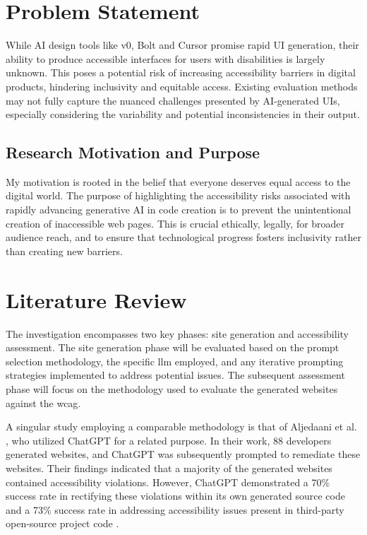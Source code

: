 \documentclass{article}
\begin{document}
\printacronyms[display=all,heading=section]

\section{Problem Statement}
While AI design tools like v0, Bolt and Cursor promise rapid UI generation,
their ability to produce accessible interfaces for users with disabilities is largely unknown.
This poses a potential risk of increasing accessibility barriers in digital products, hindering inclusivity and equitable access.
Existing evaluation methods may not fully capture the nuanced challenges presented by AI-generated UIs, especially considering the variability
and potential inconsistencies in their output.

\subsection{Research Motivation and Purpose}

My motivation is rooted in the belief that everyone deserves equal access to the digital world.
The purpose of highlighting the accessibility risks associated with rapidly advancing generative AI in code creation is
to prevent the unintentional creation of inaccessible web pages.
This is crucial ethically, legally, for broader audience reach, and to ensure that technological progress fosters inclusivity rather than creating new barriers.

\section{Literature Review}
The investigation encompasses two key phases: site generation and accessibility assessment.
The site generation phase will be evaluated based on the prompt selection methodology, the specific \ac{llm} employed,
and any iterative prompting strategies implemented to address potential issues.
The subsequent assessment phase will focus on the methodology used to evaluate the generated websites against the \ac{wcag}.

A singular study employing a comparable methodology is that of Aljedaani et al. \cite{aljedaani_does_2024}, who utilized ChatGPT for a related purpose.
In their work, 88 developers generated websites, and ChatGPT was subsequently prompted to remediate these websites.
Their findings indicated that a majority of the generated websites contained accessibility violations.
However, ChatGPT demonstrated a 70\% success rate in rectifying these violations within its own generated source code
and a 73\% success rate in addressing accessibility issues present in third-party open-source project code \cite{aljedaani_does_2024}.
\end{document}
